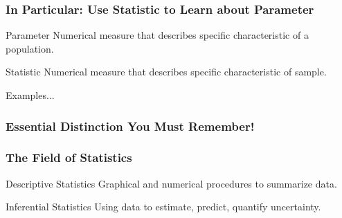 \documentclass{beamer}
\begin{document}

\begin{frame}

\frametitle{In Particular: Use Statistic to Learn about Parameter}

\begin{block}{Parameter}
Numerical measure that describes specific characteristic of a population.
\end{block}

\begin{block}{Statistic}
Numerical measure that describes specific characteristic of sample.
\end{block}

\begin{block}{\hfill Examples...}\end{block}

\end{frame}


\begin{frame}
\frametitle{Essential Distinction You Must Remember!}
\begin{figure}
\centering
{}
\end{figure}
\end{frame}



\begin{frame}

\frametitle{The Field of Statistics}

\begin{block}{Descriptive Statistics}
Graphical and numerical procedures to summarize data.
\end{block}


\begin{block}{Inferential Statistics}
Using data to estimate, predict, quantify uncertainty.
\end{block}


\end{frame}
\end{document}
